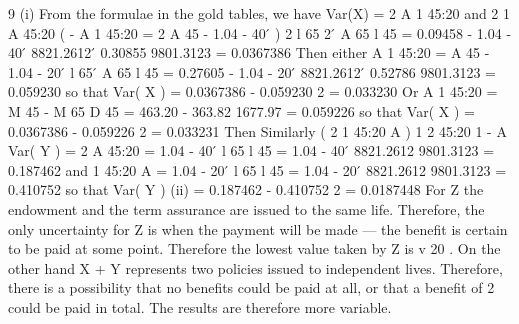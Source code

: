 \documentclass[a4paper,12pt]{article}
\begin{document}
9
(i)
From the formulae in the gold tables, we have
Var(X) = 2 A 1
45:20
and
2 1
A
45:20
(
- A 1
45:20
= 2 A 45 - 1.04 - 40  ́
)
2
l 65 2
 ́ A 65
l 45
= 0.09458 - 1.04 - 40  ́
8821.2612
 ́ 0.30855
9801.3123
= 0.0367386
Then either
A 1
45:20
= A 45 - 1.04 - 20  ́
l 65
 ́ A 65
l 45
= 0.27605 - 1.04 - 20  ́
8821.2612
 ́ 0.52786
9801.3123
= 0.059230
so that
Var( X ) = 0.0367386 - 0.059230 2
= 0.033230
Or
A 1
45:20
= M 45 - M 65
D 45
= 463.20 - 363.82
1677.97
= 0.059226
so that
Var( X ) = 0.0367386 - 0.059226 2
= 0.033231
Then
Similarly
(
2
1
45:20
A
)
1 2
45:20
1
- A
Var( Y ) = 2 A 45:20
= 1.04 - 40  ́ l 65
l 45
= 1.04 - 40  ́ 8821.2612
9801.3123
= 0.187462
and
1
45:20
A
= 1.04 - 20  ́ l 65
l 45
= 1.04 - 20  ́ 8821.2612
9801.3123
= 0.410752
so that
Var( Y )
(ii)
= 0.187462 - 0.410752 2 = 0.0187448
For Z the endowment and the term assurance are issued to the same life.
Therefore, the only uncertainty for Z is when the payment will be made — the
benefit is certain to be paid at some point. Therefore the lowest value taken by
Z is v 20 .
On the other hand X + Y represents two policies issued to independent lives.
Therefore, there is a possibility that no benefits could be paid at all, or that a
benefit of 2 could be paid in total. The results are therefore more variable.
\end{document}
